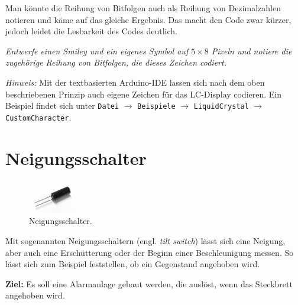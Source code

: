 \begin{aufgabe}
	Man könnte die Reihung von Bitfolgen auch als Reihung von Dezimalzahlen notieren und käme auf das gleiche Ergebnis. Das macht den Code zwar kürzer, jedoch leidet die Lesbarkeit des Codes deutlich.
	
	\emph{Entwerfe einen Smiley und ein eigenes Symbol auf $5 \times 8$ Pixeln und notiere die zugehörige Reihung von Bitfolgen, die dieses Zeichen codiert.}
	
	\emph{Hinweis:} Mit der textbasierten Arduino-IDE lassen sich nach dem oben beschriebenen Prinzip auch eigene Zeichen für das LC-Display codieren. Ein Beispiel findet sich unter \texttt{Datei} $\rightarrow$ \texttt{Beispiele} $\rightarrow$ \texttt{LiquidCrystal} $\rightarrow$ \texttt{CustomCharacter}.
\end{aufgabe}


\newpage
\section{Neigungsschalter}
\label{sec:neigungsschalter}
\setcounter{aufgabennummer}{0}
\setcounter{projektnummer}{0}

\begin{figure}
	\centering
	\vspace{-\baselineskip}
	\includegraphics[width=0.2\textwidth]{./pics/neigungsschalter.png}
	\caption{Neigungsschalter.}
	\vspace{-\baselineskip}
\end{figure}
Mit sogenannten Neigungsschaltern (engl. \emph{tilt switch}) lässt sich eine Neigung, aber auch eine Erschütterung oder der Beginn einer Beschleunigung messen. So lässt sich zum Beispiel feststellen, ob ein Gegenstand angehoben wird.

\begin{ziel}
	\textbf{Ziel:} Es soll eine Alarmanlage gebaut werden, die auslöst, wenn das Steckbrett angehoben wird.
\end{ziel}

